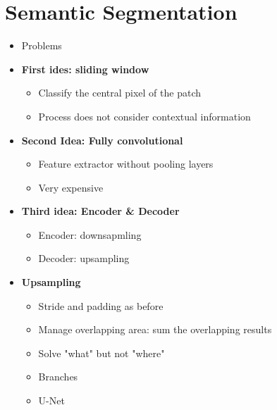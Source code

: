 \documentclass[12pt,oneside]{report}
\begin{document}
\section{Semantic Segmentation}
\begin{itemize}
    \item Problems
    \item \textbf{First ides: sliding window}
    \begin{itemize}
        \item Classify the central pixel of the patch
        \item Process does not consider contextual information
    \end{itemize}
    \item \textbf{Second Idea: Fully convolutional}
    \begin{itemize}
        \item Feature extractor without pooling layers
        \item Very expensive
    \end{itemize}
    \item \textbf{Third idea: Encoder \& Decoder}
    \begin{itemize}
        \item Encoder: downsapmling
        \item Decoder: upsampling
    \end{itemize}
    \item \textbf{Upsampling}
    \begin{itemize}
        \item Stride and padding as before
        \item Manage overlapping area: sum the overlapping results
        \item Solve "what" but not "where"
        \item Branches
        \item U-Net
    \end{itemize}
\end{itemize}
\end{document}
